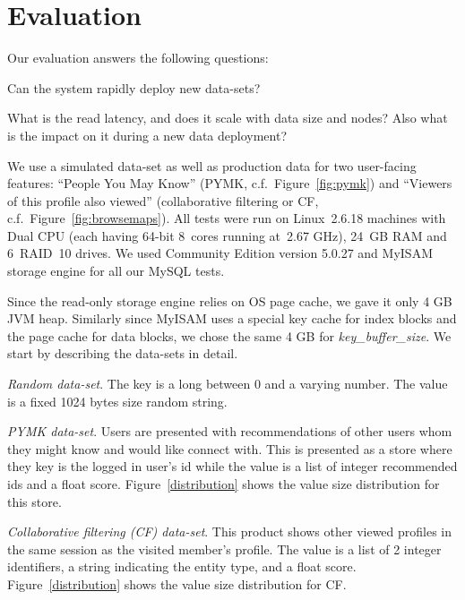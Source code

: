 \section{Evaluation}
\label{sec:evaluation}

Our evaluation answers the following questions:
\begin{compactenum}
\item Can the system rapidly deploy new data-sets? 
\item What is the read latency, and does it scale with data size and nodes? 
Also what is the impact on it during a new data deployment?
\end{compactenum}

We use a simulated data-set as well as production data for two
user-facing features: ``People You May Know'' (PYMK,
c.f.~Figure~\ref{fig:pymk}) and ``Viewers of this profile also
viewed'' (collaborative filtering or CF,
c.f.~Figure~\ref{fig:browsemaps}). All tests were run on Linux~2.6.18
machines with Dual CPU (each having 64-bit 8~cores running at~2.67 GHz),
24~GB RAM and 6~RAID~10 drives. We used Community Edition
version 5.0.27 and MyISAM storage engine for all our MySQL tests.

Since the read-only storage engine relies on OS page cache, we gave 
it only 4 GB JVM heap. Similarly since MyISAM uses a special key cache
for index blocks and the page cache for data blocks, we chose the same
4 GB for \emph{key\_buffer\_size}. We start by describing the data-sets in detail.

\begin{compactitem}
\item \emph{Random data-set}. The key is a long between
0 and a varying number. The value is a fixed 1024 bytes size random
string. 
\item \emph{PYMK data-set}. Users are presented with recommendations
of other users whom they might know and would like connect with. This
is presented as a store where they key is the logged in user's id
while the value is a list of integer recommended ids and a float
score. Figure~\ref{distribution} shows the value size distribution for
this store. 
\item \emph{Collaborative filtering (CF) data-set}. This product shows
other viewed profiles in the same session as the visited member's
profile. The value is a list of 2 integer identifiers, a string
indicating the entity type, and a float score.
Figure~\ref{distribution} shows the value size distribution for CF. 
\end{compactitem}

